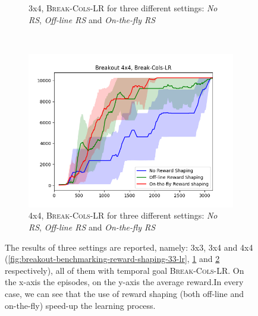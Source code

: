 \begin{figure}[h]
\begin{subfigure}[b]{0.65\textwidth}
	 	\caption{\Breakout 3x4, \textsc{Break-Cols-LR} for three different settings: \emph{No RS}, \emph{Off-line RS} and \emph{On-the-fly RS}}
	 	\label{fig:breakout-benchmarking-reward-shaping-34-lr}
	 \end{subfigure}
	 ~ %
	 \begin{subfigure}[b]{0.65\textwidth}
	 	\includegraphics[width=\textwidth]{images/rs-comparison_b44.png}
	 	\caption{\Breakout 4x4, \textsc{Break-Cols-LR} for three different settings: \emph{No RS}, \emph{Off-line RS} and \emph{On-the-fly RS}}
	 	\label{fig:breakout-benchmarking-reward-shaping-44-lr}
	 \end{subfigure}
	 \caption{The results of three settings are reported, namely: \Breakout 3x3, 3x4 and 4x4 (\ref{fig:breakout-benchmarking-reward-shaping-33-lr}, \ref{fig:breakout-benchmarking-reward-shaping-34-lr} and  \ref{fig:breakout-benchmarking-reward-shaping-44-lr} respectively), all of them with temporal goal \textsc{Break-Cols-LR}. On the x-axis the episodes, on the y-axis the average reward.In every case, we can see that the use of reward shaping (both off-line and on-the-fly) speed-up the learning process. }\label{fig:breakout-benchmarking-reward-shaping-lr-different-bricks}
\end{figure}


